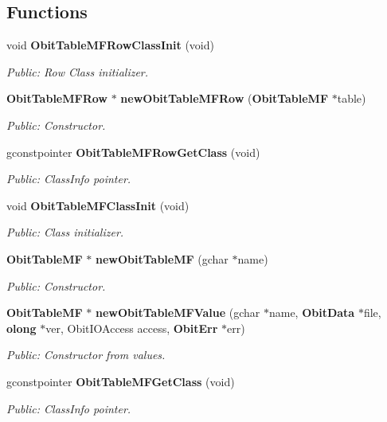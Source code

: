 \subsection*{Functions}
\begin{CompactItemize}
\item 
void {\bf Obit\-Table\-MFRow\-Class\-Init} (void)
\begin{CompactList}\small\item\em Public: Row Class initializer. \item\end{CompactList}\item 
{\bf Obit\-Table\-MFRow} $\ast$ {\bf new\-Obit\-Table\-MFRow} ({\bf Obit\-Table\-MF} $\ast$table)
\begin{CompactList}\small\item\em Public: Constructor. \item\end{CompactList}\item 
gconstpointer {\bf Obit\-Table\-MFRow\-Get\-Class} (void)
\begin{CompactList}\small\item\em Public: Class\-Info pointer. \item\end{CompactList}\item 
void {\bf Obit\-Table\-MFClass\-Init} (void)
\begin{CompactList}\small\item\em Public: Class initializer. \item\end{CompactList}\item 
{\bf Obit\-Table\-MF} $\ast$ {\bf new\-Obit\-Table\-MF} (gchar $\ast$name)
\begin{CompactList}\small\item\em Public: Constructor. \item\end{CompactList}\item 
{\bf Obit\-Table\-MF} $\ast$ {\bf new\-Obit\-Table\-MFValue} (gchar $\ast$name, {\bf Obit\-Data} $\ast$file, {\bf olong} $\ast$ver, Obit\-IOAccess access, {\bf Obit\-Err} $\ast$err)
\begin{CompactList}\small\item\em Public: Constructor from values. \item\end{CompactList}\item 
gconstpointer {\bf Obit\-Table\-MFGet\-Class} (void)
\begin{CompactList}\small\item\em Public: Class\-Info pointer. \item\end{CompactList}\item 

\end{CompactItemize}

